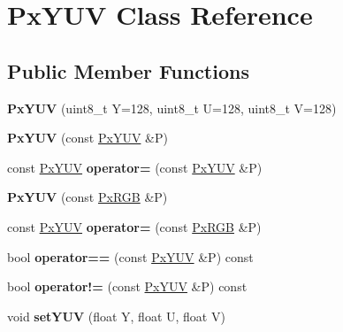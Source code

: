 \hypertarget{classPxYUV}{}\section{Px\+Y\+UV Class Reference}
\label{classPxYUV}
\subsection*{Public Member Functions}
\begin{DoxyCompactItemize}
\item 
{\bfseries Px\+Y\+UV} (uint8\+\_\+t Y=128, uint8\+\_\+t U=128, uint8\+\_\+t V=128)\hypertarget{classPxYUV_ad50f7365bb86f56a7ec0c1ed910ea622}{}\label{classPxYUV_ad50f7365bb86f56a7ec0c1ed910ea622}

\item 
{\bfseries Px\+Y\+UV} (const \hyperlink{classPxYUV}{Px\+Y\+UV} \&P)\hypertarget{classPxYUV_a72a7a9f44d8177a7ef4dbcf8ea2dd894}{}\label{classPxYUV_a72a7a9f44d8177a7ef4dbcf8ea2dd894}

\item 
const \hyperlink{classPxYUV}{Px\+Y\+UV} {\bfseries operator=} (const \hyperlink{classPxYUV}{Px\+Y\+UV} \&P)\hypertarget{classPxYUV_a93f6dcb6a3ef8efe2d595b867db43e98}{}\label{classPxYUV_a93f6dcb6a3ef8efe2d595b867db43e98}

\item 
{\bfseries Px\+Y\+UV} (const \hyperlink{classPxRGB}{Px\+R\+GB} \&P)\hypertarget{classPxYUV_a319efd082ec54fd247a1dbf3e609bf50}{}\label{classPxYUV_a319efd082ec54fd247a1dbf3e609bf50}

\item 
const \hyperlink{classPxYUV}{Px\+Y\+UV} {\bfseries operator=} (const \hyperlink{classPxRGB}{Px\+R\+GB} \&P)\hypertarget{classPxYUV_a263f647f8bd169409337537eb2e9eba9}{}\label{classPxYUV_a263f647f8bd169409337537eb2e9eba9}

\item 
bool {\bfseries operator==} (const \hyperlink{classPxYUV}{Px\+Y\+UV} \&P) const \hypertarget{classPxYUV_aece081e733187fc6de2dbef38f3d929f}{}\label{classPxYUV_aece081e733187fc6de2dbef38f3d929f}

\item 
bool {\bfseries operator!=} (const \hyperlink{classPxYUV}{Px\+Y\+UV} \&P) const \hypertarget{classPxYUV_a5247560dbee318f595a862100aa51304}{}\label{classPxYUV_a5247560dbee318f595a862100aa51304}

\item 
void {\bfseries set\+Y\+UV} (float Y, float U, float V)\hypertarget{classPxYUV_ad6d541022aed3b93b57e51c502e0c19d}{}\label{classPxYUV_ad6d541022aed3b93b57e51c502e0c19d}


\end{DoxyCompactItemize}
